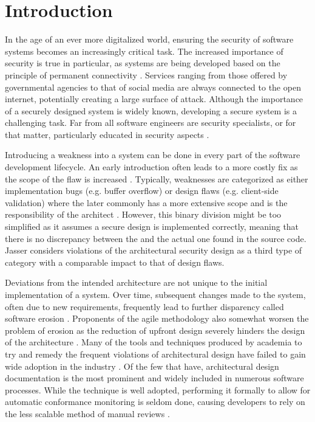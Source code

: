 \chapter{Introduction}
In the age of an ever more digitalized world, ensuring the security of software systems becomes an increasingly critical task. The increased importance of security is true in particular, as systems are being developed based on the principle of permanent connectivity \cite{felderer_security_2016}.  Services ranging from those offered by governmental agencies to that of social media are always connected to the open internet, potentially creating a large surface of attack. Although the importance of a securely designed system is widely known, developing a secure system is a challenging task. Far from all software engineers are security specialists, or for that matter, particularly educated in security aspects \cite{yoshioka_survey_2008}.

Introducing a weakness into a system can be done in every part of the software development lifecycle. An early introduction often leads to a more costly fix as the scope of the flaw is increased \cite{mcgraw_software_2004}. Typically, weaknesses are categorized as either implementation bugs (e.g. buffer overflow) or design flaws (e.g. client-side validation) where the later commonly has a more extensive scope and is the responsibility of the architect \cite{arce_avoiding_2014}. However, this binary division might be too simplified as it assumes a secure design is implemented correctly, meaning that there is no discrepancy between the  and the actual one found in the source code. Jasser \cite{franch_constraining_2019} considers violations of the architectural security design as a third type of category with a comparable impact to that of design flaws.

Deviations from the intended architecture are not unique to the initial implementation of a system. Over time, subsequent changes made to the system, often due to new requirements, frequently lead to further disparency called software erosion \cite{de_silva_controlling_2012}. Proponents of the agile methodology also somewhat worsen the problem of erosion as the reduction of upfront design severely hinders the design of the architecture \cite{van_gurp_design_2002}. Many of the tools and techniques produced by academia to try and remedy the frequent violations of architectural design have failed to gain wide adoption in the industry \cite{de_silva_controlling_2012}.  Of the few that have, architectural design documentation is the most prominent and widely included in numerous software processes. While the technique is well adopted, performing it formally to allow for automatic conformance monitoring is seldom done, causing developers to rely on the less scalable method of manual reviews \cite{de_silva_controlling_2012}.

